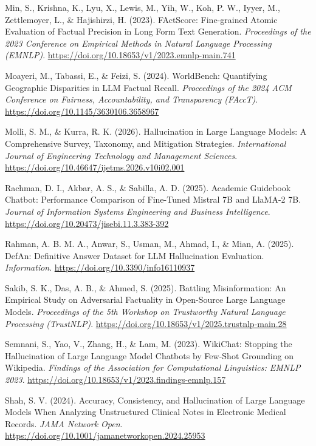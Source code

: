 \documentclass[
  11pt,
  a4paper,
]{article}
\newlength{\cslhangindent}
\newenvironment{CSLReferences}[2] %
 {\begin{list}{}{%
  \setlength{\itemindent}{0pt}
  \setlength{\leftmargin}{0pt}
  \setlength{\parsep}{0pt}
  \ifodd #1
   \setlength{\leftmargin}{\cslhangindent}
   \setlength{\itemindent}{-1\cslhangindent}
  \fi
  \setlength{\itemsep}{#2\baselineskip}}}
 {\end{list}}
\begin{document}
\begin{CSLReferences}{1}{0}
Min, S., Krishna, K., Lyu, X., Lewis, M., Yih, W., Koh, P. W., Iyyer,
M., Zettlemoyer, L., \& Hajishirzi, H. (2023). {FActScore: Fine-grained
Atomic Evaluation of Factual Precision in Long Form Text Generation}.
\emph{Proceedings of the 2023 Conference on Empirical Methods in Natural
Language Processing (EMNLP)}.
\url{https://doi.org/10.18653/v1/2023.emnlp-main.741}

Moayeri, M., Tabassi, E., \& Feizi, S. (2024). {WorldBench: Quantifying
Geographic Disparities in LLM Factual Recall}. \emph{Proceedings of the
2024 ACM Conference on Fairness, Accountability, and Transparency
(FAccT)}. \url{https://doi.org/10.1145/3630106.3658967}

Molli, S. M., \& Kurra, R. K. (2026). {Hallucination in Large Language
Models: A Comprehensive Survey, Taxonomy, and Mitigation Strategies}.
\emph{International Journal of Engineering Technology and Management
Sciences}. \url{https://doi.org/10.46647/ijetms.2026.v10i02.001}

Rachman, D. I., Akbar, A. S., \& Sabilla, A. D. (2025). {Academic
Guidebook Chatbot: Performance Comparison of Fine-Tuned Mistral 7B and
LlaMA-2 7B}. \emph{Journal of Information Systems Engineering and
Business Intelligence}.
\url{https://doi.org/10.20473/jisebi.11.3.383-392}

Rahman, A. B. M. A., Anwar, S., Usman, M., Ahmad, I., \& Mian, A.
(2025). {DefAn: Definitive Answer Dataset for LLM Hallucination
Evaluation}. \emph{Information}.
\url{https://doi.org/10.3390/info16110937}

Sakib, S. K., Das, A. B., \& Ahmed, S. (2025). {Battling Misinformation:
An Empirical Study on Adversarial Factuality in Open-Source Large
Language Models}. \emph{Proceedings of the 5th Workshop on Trustworthy
Natural Language Processing (TrustNLP)}.
\url{https://doi.org/10.18653/v1/2025.trustnlp-main.28}

Semnani, S., Yao, V., Zhang, H., \& Lam, M. (2023). {WikiChat: Stopping
the Hallucination of Large Language Model Chatbots by Few-Shot Grounding
on Wikipedia}. \emph{Findings of the Association for Computational
Linguistics: EMNLP 2023}.
\url{https://doi.org/10.18653/v1/2023.findings-emnlp.157}

Shah, S. V. (2024). {Accuracy, Consistency, and Hallucination of Large
Language Models When Analyzing Unstructured Clinical Notes in Electronic
Medical Records}. \emph{JAMA Network Open}.
\url{https://doi.org/10.1001/jamanetworkopen.2024.25953}


\end{CSLReferences}
\end{document}
